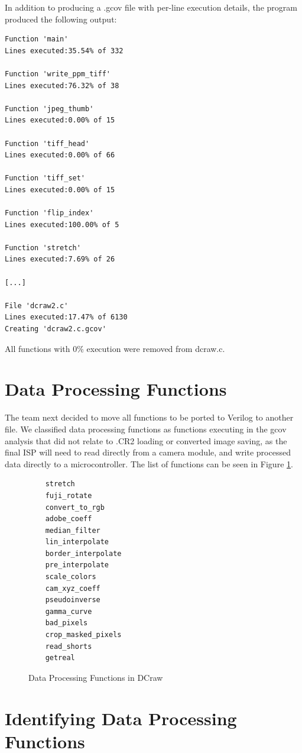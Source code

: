 \documentclass{report}
\begin{document}
In addition to producing a .gcov file with per-line execution details, the program produced the following output:

\begin{verbatim}
Function 'main'
Lines executed:35.54% of 332

Function 'write_ppm_tiff'
Lines executed:76.32% of 38

Function 'jpeg_thumb'
Lines executed:0.00% of 15

Function 'tiff_head'
Lines executed:0.00% of 66

Function 'tiff_set'
Lines executed:0.00% of 15

Function 'flip_index'
Lines executed:100.00% of 5

Function 'stretch'
Lines executed:7.69% of 26

[...] 

File 'dcraw2.c'
Lines executed:17.47% of 6130
Creating 'dcraw2.c.gcov'
\end{verbatim}

All functions with 0\% execution were removed from dcraw.c.

\section{Data Processing Functions}

The team next decided to move all functions to be ported to Verilog to another file. We classified data processing functions as functions executing in the gcov analysis that did not relate to .CR2 loading or converted image saving, as the final ISP will need to read directly from a camera module, and write processed data directly to a microcontroller. The list of functions can be seen in Figure \ref{dcfunct}.

\begin{figure}[!htb]
	\label{dcfunct}
	\caption{Data Processing Functions in DCraw}
	\begin{verbatim}
	stretch
	fuji_rotate
	convert_to_rgb
	adobe_coeff
	median_filter
	lin_interpolate
	border_interpolate
	pre_interpolate
	scale_colors
	cam_xyz_coeff
	pseudoinverse
	gamma_curve
	bad_pixels
	crop_masked_pixels
	read_shorts
	getreal
	\end{verbatim}
\end{figure}

\section{Identifying Data Processing Functions}
\end{document}
